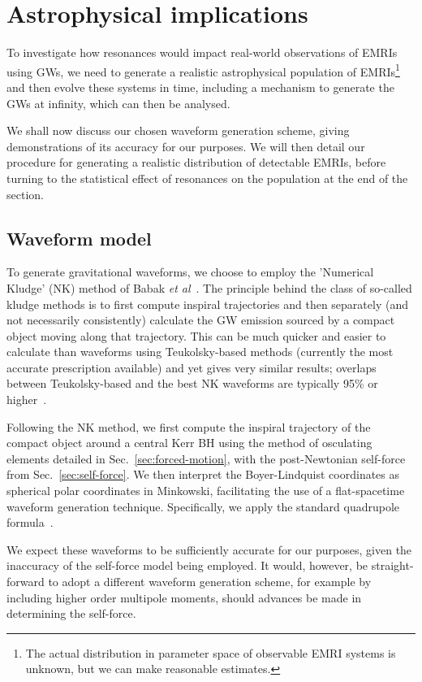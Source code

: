 \documentclass[aps,prd,amsfonts,amssymb,amsmath,nofootinbib,reprint,showpacs,superscriptaddress,twocolumn]{revtex4}
\newcommand{\secref}[1]{Sec.\ \ref{sec:#1}}
\begin{document}
\section{Astrophysical implications}
\label{sec:astrophysics}

To investigate how resonances would impact real-world observations of EMRIs using GWs, we need to generate a realistic astrophysical population of EMRIs\footnote{The actual distribution in parameter space of observable EMRI systems is unknown, but we can make reasonable estimates.} and then evolve these systems in time, including a mechanism to generate the GWs at infinity, which can then be analysed.

We shall now discuss our chosen waveform generation scheme, giving demonstrations of its accuracy for our purposes. We will then detail our procedure for generating a realistic distribution of detectable EMRIs, before turning to the statistical effect of resonances on the population at the end of the section.

\subsection{Waveform model}

To generate gravitational waveforms, we choose to employ the 'Numerical Kludge' (NK) method of Babak \emph{et al}~\cite{Babak2007}. The principle behind the class of so-called kludge methods is to first compute inspiral trajectories and then separately (and not necessarily consistently) calculate the GW emission sourced by a compact object moving along that trajectory. This can be much quicker and easier to calculate than waveforms using Teukolsky-based methods (currently the most accurate prescription available) and yet gives very similar results; overlaps between Teukolsky-based and the best NK waveforms are typically 95\% or higher~\cite{Babak2007}.

Following the NK method, we first compute the inspiral trajectory of the compact object around a central Kerr BH using the method of osculating elements detailed in \secref{forced-motion}, with the post-Newtonian self-force from \secref{self-force}. We then interpret the Boyer-Lindquist coordinates as spherical polar coordinates in Minkowski, facilitating the use of a flat-spacetime waveform generation technique. Specifically, we apply the standard quadrupole formula~\cite{Misner1973}.

We expect these waveforms to be sufficiently accurate for our purposes, given the inaccuracy of the self-force model being employed. It would, however, be straight-forward to adopt a different waveform generation scheme, for example by including higher order multipole moments, should advances be made in determining the self-force.
\end{document}
